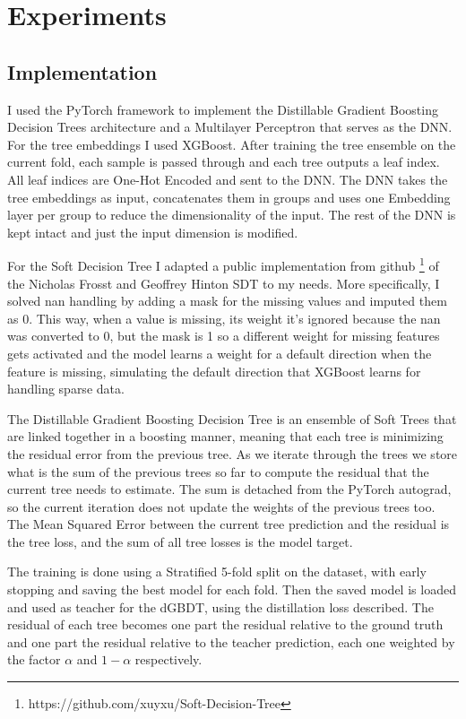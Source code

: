 \chapter{Experiments}
\section{Implementation}
I used the PyTorch framework to implement the Distillable Gradient Boosting Decision Trees architecture and a Multilayer Perceptron that serves as the DNN. For the tree embeddings I used XGBoost. After training the tree ensemble on the current fold, each sample is passed through and each tree outputs a leaf index. All leaf indices are One-Hot Encoded and sent to the DNN. The DNN takes the tree embeddings as input, concatenates them in groups and uses one Embedding layer per group to reduce the dimensionality of the input. The rest of the DNN is kept intact and just the input dimension is modified.

For the Soft Decision Tree I adapted a public implementation from github \footnote{https://github.com/xuyxu/Soft-Decision-Tree} of the Nicholas Frosst and Geoffrey Hinton SDT to my needs. More specifically, I solved nan handling by adding a mask for the missing values and imputed them as 0. This way, when a value is missing, its weight it’s ignored because the nan was converted to 0, but the mask is 1 so a different weight for missing features gets activated and the model learns a weight for a default direction when the feature is missing, simulating the default direction that XGBoost learns for handling sparse data.

The Distillable Gradient Boosting Decision Tree is an ensemble of Soft Trees that are linked together in a boosting manner, meaning that each tree is minimizing the residual error from the previous tree. As we iterate through the trees we store what is the sum of the previous trees so far to compute the residual that the current tree needs to estimate. The sum is detached from the PyTorch autograd, so the current iteration does not update the weights of the previous trees too. The Mean Squared Error between the current tree prediction and the residual is the tree loss, and the sum of all tree losses is the model target.

The training is done using a Stratified 5-fold split on the dataset, with early stopping and saving the best model for each fold. Then the saved model is loaded and used as teacher for the dGBDT, using the distillation loss described. The residual of each tree becomes one part the residual relative to the ground truth and one part the residual relative to the teacher prediction, each one weighted by the factor $\alpha$ and $1 -\alpha$ respectively.

